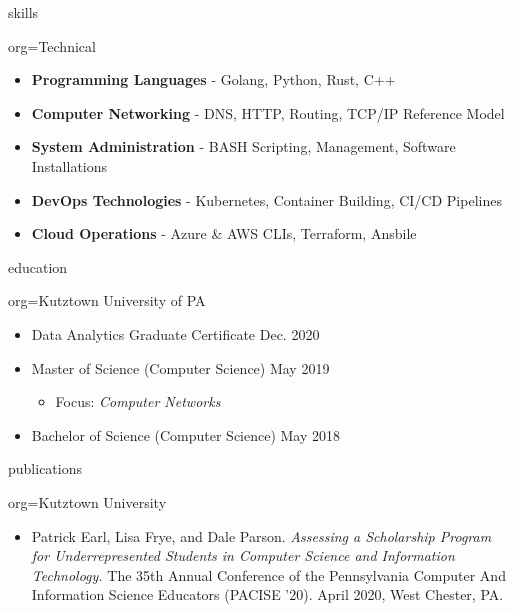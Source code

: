 \documentclass{resume}
\begin{document}
\begin{ResumeSection}{skills}
    \newcommand{\skill}[2]{\textbf{#1} - #2}
    \begin{ResumeSubsection}{org=Technical}
        \begin{itemize}
            \item \skill{Programming Languages}{Golang, Python, Rust, C++}
            \item \skill{Computer Networking}{DNS, HTTP, Routing, TCP/IP Reference Model}
            \item \skill{System Administration}{BASH Scripting, Management, Software Installations}
            \item \skill{DevOps Technologies}{Kubernetes, Container Building, CI/CD Pipelines}
            \item \skill{Cloud Operations}{Azure \& AWS CLIs, Terraform, Ansbile}
        \end{itemize}
    \end{ResumeSubsection}
\end{ResumeSection}

\begin{ResumeSection}{education}
    \begin{ResumeSubsection}{org={Kutztown University of PA}}
        \begin{itemize}
            \item Data Analytics Graduate Certificate \hfill Dec. 2020
            \item Master of Science (Computer Science) \hfill May 2019
            \begin{itemize}
                \item Focus: \emph{Computer Networks}
            \end{itemize}
            \item Bachelor of Science (Computer Science) \hfill May 2018
        \end{itemize}
    \end{ResumeSubsection}
\end{ResumeSection}

\begin{ResumeSection}{publications}
    \begin{ResumeSubsection}{org={Kutztown University}}
        \begin{itemize}
            \item Patrick Earl, Lisa Frye, and Dale Parson. \emph{Assessing a Scholarship Program for Underrepresented Students in Computer Science and Information Technology.} The 35th Annual Conference of the Pennsylvania Computer And Information Science Educators (PACISE '20). April 2020, West Chester, PA. 
        \end{itemize}
    \end{ResumeSubsection}
\end{ResumeSection}
\end{document}
